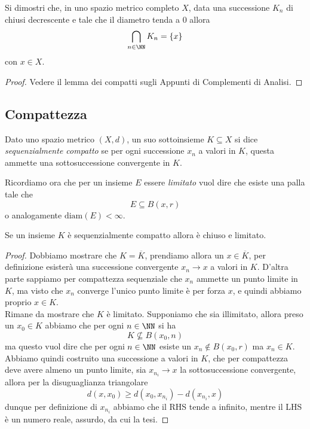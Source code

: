 \documentclass[11pt]{scrartcl}
\begin{document}
	\begin{lemma}\label{lemma dei compatti}
		Si dimostri che, in uno spazio metrico completo $X$, data una successione $K_n$ di chiusi decrescente e tale che il diametro tenda a $0$ allora
		$$\bigcap_{n\in\NN} K_n=\left\{x\right\} $$
		con $x\in X$.
	\end{lemma}
	\begin{proof}
		Vedere il lemma dei compatti sugli Appunti di Complementi di Analisi.
	\end{proof}
	\subsection{Compattezza}
	\begin{definition}
		Dato uno spazio metrico $(X,d)$, un suo sottoinsieme $K\subseteq X$ si dice \textit{sequenzialmente compatto} se per ogni successione $x_n$ a valori in $K$, questa ammette una sottosuccessione convergente in $K$.
	\end{definition}
	Ricordiamo ora che per un insieme $E$ essere \textit{limitato} vuol dire che esiste una palla tale che
	$$E\subseteq B(x,r)$$
	o analogamente $\text{diam}(E)<\infty$. 
	\begin{proposition}
		Se un insieme $K$ è sequenzialmente compatto allora è chiuso e limitato.
	\end{proposition}
	\begin{proof}
		Dobbiamo mostrare che $K=\overline{K}$, prendiamo allora un $x\in \overline{K}$, per definizione esisterà una successione convergente $x_n\to x$ a valori in $K$. D'altra parte sappiamo per compattezza sequenziale che $x_n$ ammette un punto limite in $K$, ma visto che $x_n$ converge l'unico punto limite è per forza $x$, e quindi abbiamo proprio $x\in K$. \\
		Rimane da mostrare che $K$ è limitato. Supponiamo che sia illimitato, allora preso un $x_0\in K$ abbiamo che per ogni $n\in\NN$ si ha
		$$K\not\subseteq B(x_0,n)$$
		ma questo vuol dire che per ogni $n\in \NN$ esiste un $x_n\not\in B(x_0,r)$ ma $x_n\in K$. Abbiamo quindi costruito una successione a valori in $K$, che per compattezza deve avere almeno un punto limite, sia $x_{n_i}\to x$ la sottosuccessione convergente, allora per la disuguaglianza triangolare
		$$d(x,x_0)\ge d(x_0,x_{n_i})-d(x_{n_i},x)$$
		dunque per definizione di $x_{n_i}$ abbiamo che il RHS tende a infinito, mentre il LHS è un numero reale, assurdo, da cui la tesi.
	\end{proof}
\end{document}
